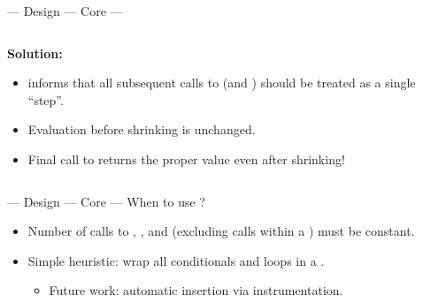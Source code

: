 \begin{frame}[fragile,t]{\halcheck{} --- Design --- Core --- }
\begin{columns}[T]
\begin{overprint}
      \textbf{Solution:} 
      \begin{itemize}
        \item<8->  informs \halcheck{} that all subsequent calls to  (and ) should be treated as a single ``step''.
        \item<9-> Evaluation before shrinking is unchanged.
        \item<10-> Final call to  returns the proper value even after shrinking!
      \end{itemize}
    \end{overprint}
  \end{columns}
\end{frame}

\begin{frame}[fragile,t]{\halcheck{} --- Design --- Core --- }
  When to use ?
  \begin{itemize}
    \item Number of calls to , , and  (excluding calls within a ) must be \alert{constant}.
    \item Simple heuristic: wrap all conditionals and loops in a .
    \begin{itemize}
      \item Future work: automatic  insertion via instrumentation.
    \end{itemize}
  \end{itemize}
\end{frame}

